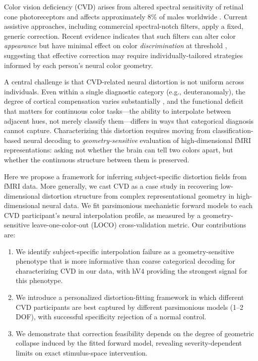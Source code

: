 \documentclass{article}
\begin{document}
Color vision deficiency (CVD) arises from altered spectral sensitivity of retinal cone photoreceptors and affects approximately 8\% of males worldwide \cite{placeholder_machado2009}.
Current assistive approaches, including commercial spectral-notch filters, apply a fixed, generic correction.
Recent evidence indicates that such filters can alter color \emph{appearance} but have minimal effect on color \emph{discrimination} at threshold \cite{placeholder_somers2024}, suggesting that effective correction may require individually-tailored strategies informed by each person's neural color geometry.

A central challenge is that CVD-related neural distortion is not uniform across individuals.
Even within a single diagnostic category (e.g., deuteranomaly), the degree of cortical compensation varies substantially \cite{placeholder_tregillus2021}, and the functional deficit that matters for continuous color tasks---the ability to interpolate between adjacent hues, not merely classify them---differs in ways that categorical diagnosis cannot capture.
Characterizing this distortion requires moving from classification-based neural decoding to \emph{geometry-sensitive} evaluation of high-dimensional fMRI representations: asking not whether the brain can tell two colors apart, but whether the continuous structure between them is preserved.

Here we propose a framework for inferring subject-specific distortion fields from fMRI data. More generally, we cast CVD as a case study in recovering low-dimensional distortion structure from complex representational geometry in high-dimensional neural data. We fit parsimonious mechanistic forward models to each CVD participant's neural interpolation profile, as measured by a geometry-sensitive leave-one-color-out (LOCO) cross-validation metric.
Our contributions are:
\begin{enumerate}
    \item We identify subject-specific interpolation failure as a geometry-sensitive phenotype that is more informative than coarse categorical decoding for characterizing CVD in our data, with hV4 providing the strongest signal for this phenotype.
    \item We introduce a personalized distortion-fitting framework in which different CVD participants are best captured by different parsimonious models (1--2 DOF), with successful specificity rejection of a normal control.
    \item We demonstrate that correction feasibility depends on the degree of geometric collapse induced by the fitted forward model, revealing severity-dependent limits on exact stimulus-space intervention.
\end{enumerate}
\end{document}
